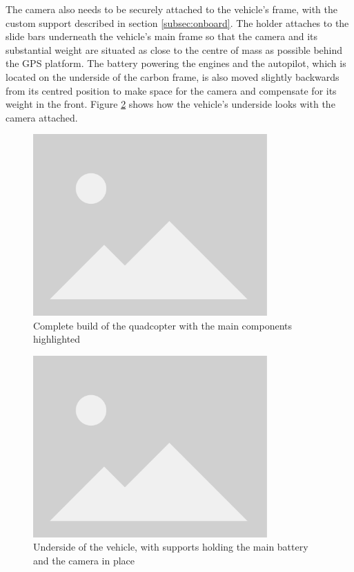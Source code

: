 The camera also needs to be securely attached to the vehicle's frame, with the custom support described in section \ref{subsec:onboard}.
The holder attaches to the slide bars underneath the vehicle's main frame so that the camera and its substantial weight are situated as close to the centre of mass as possible behind the GPS platform.
The battery powering the engines and the autopilot, which is located on the underside of the carbon frame, is also moved slightly backwards from its centred position to make space for the camera and compensate for its weight in the front.
Figure \ref{fig:camera-holder-closeup} shows how the vehicle's underside looks with the camera attached.

\begin{figure}
  \centering
  \includegraphics[width=0.8\textwidth, keepaspectratio]{img/placeholder.png}
  \caption{Complete build of the quadcopter with the main components highlighted}\label{fig:full-build}
\end{figure}

\begin{figure}
  \centering
  \includegraphics[width=0.8\textwidth, keepaspectratio]{img/placeholder.png}
  \caption{Underside of the vehicle, with supports holding the main battery and the camera in place}
  \label{fig:camera-holder-closeup}
\end{figure}


